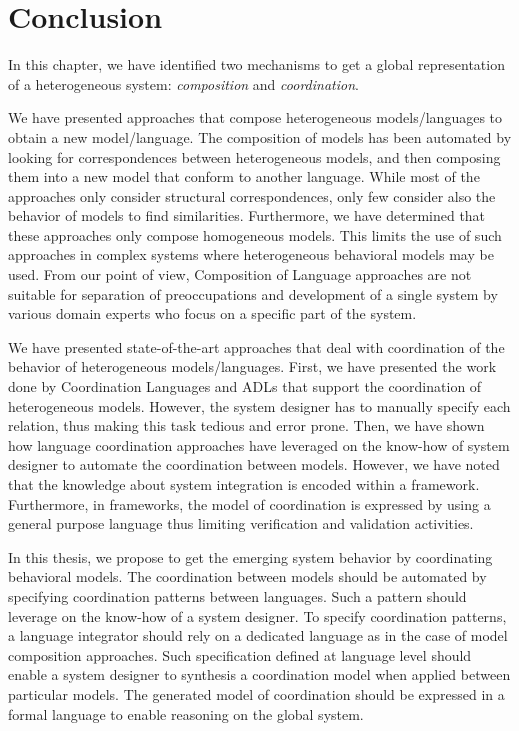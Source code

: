 \section{Conclusion}
In this chapter, we have identified two mechanisms to get a global representation of a heterogeneous system: \emph{composition} and \emph{coordination}. 

We have presented approaches that compose heterogeneous models/languages to obtain a new model/language. The composition of models has been automated by looking for correspondences between heterogeneous models, and then composing them into a new model that conform to another language. While most of the approaches only consider structural correspondences, only few consider also the behavior of models to find similarities. Furthermore, we have determined that these approaches only compose homogeneous models. This limits the use of such approaches in complex systems where heterogeneous behavioral models may be used. From our point of view, Composition of Language approaches are not suitable for separation of preoccupations and development of a single system by various domain experts who focus on a specific part of the system.

We have presented state-of-the-art approaches that deal with coordination of the behavior of heterogeneous models/languages. First, we have presented the work done by Coordination Languages and ADLs that support the coordination of heterogeneous models. However, the system designer has to manually specify each relation, thus making this task tedious and error prone. Then, we have shown how language coordination approaches have leveraged on the know-how of system designer to automate the coordination between models. However, we have noted that the knowledge about system integration is encoded within a framework. Furthermore, in frameworks, the model of coordination is expressed by using a general purpose language thus limiting verification and validation activities. 

In this thesis, we propose to get the emerging system behavior by coordinating behavioral models. The coordination between models should be automated by specifying coordination patterns between languages. Such a pattern should leverage on the know-how of a system designer. To specify coordination patterns, a language integrator should rely on a dedicated language as in the case of model composition approaches. Such specification defined at language level should enable a system designer to synthesis a coordination model when applied between particular models. The generated model of coordination should be expressed in a formal language to enable reasoning on the global system. 

